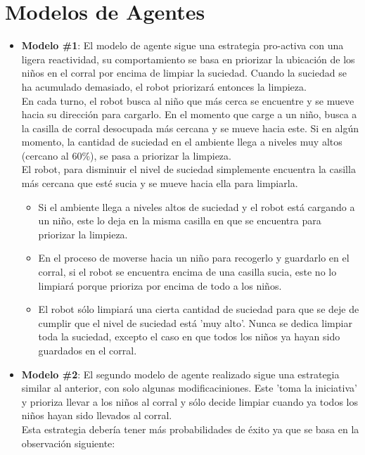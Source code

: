 \documentclass[12pt]{article}
\begin{document}
\section{Modelos de Agentes}
\begin{itemize}
	\item \textbf{Modelo \#1}:
	El modelo de agente sigue una estrategia pro-activa con una ligera
	reactividad, 
	su comportamiento se basa en priorizar la ubicaci\'on de los ni\~nos en el 
	corral por encima de limpiar la suciedad. Cuando la suciedad se
	ha acumulado demasiado, el robot priorizar\'a entonces la 
	limpieza.\\
	En cada turno, el robot busca al ni\~no que m\'as cerca se encuentre 
	y se mueve hacia su direcci\'on para cargarlo. En el momento que carge
	a un ni\~no, busca a la casilla de corral desocupada m\'as cercana y 
	se mueve hacia este. Si en alg\'un momento, la cantidad de suciedad en el
	ambiente llega a 	niveles muy altos (cercano al 60\%), se pasa a priorizar
	la limpieza.\\
	El robot, para disminuir el nivel de suciedad simplemente encuentra la 
	casilla m\'as cercana que est\'e sucia y se mueve hacia ella para limpiarla.
	\begin{itemize} \textit{Algunos detalles sobre este modelo:}
		\item Si el ambiente llega a niveles altos de suciedad y el robot 
		est\'a cargando a un ni\~no, este lo deja en la misma casilla en que se
		encuentra para priorizar la limpieza.
		\item En el proceso de moverse hacia un ni\~no para recogerlo y guardarlo
		en el corral, si el robot se encuentra encima de una casilla sucia, este 
		no lo limpiar\'a porque prioriza por encima de todo a los ni\~nos.
		\item El robot s\'olo limpiar\'a una cierta cantidad de suciedad para que
		se deje de cumplir que el nivel de suciedad est\'a 'muy alto'. Nunca se 
		dedica limpiar toda la suciedad, excepto el caso en que todos los ni\~nos
		ya hayan sido guardados en el corral.
	\end{itemize}
	\item \textbf{Modelo \#2}:
	El segundo modelo de agente realizado sigue una estrategia similar al anterior, con solo algunas
	modificaciniones.
	Este 'toma la iniciativa' y prioriza llevar a los ni\~nos al corral y s\'olo decide limpiar cuando
	ya todos los ni\~nos hayan sido llevados al corral.\\
	Esta estrategia deber\'ia tener m\'as probabilidades de \'exito ya que se basa en la observaci\'on siguiente:

\end{itemize}
\end{document}
